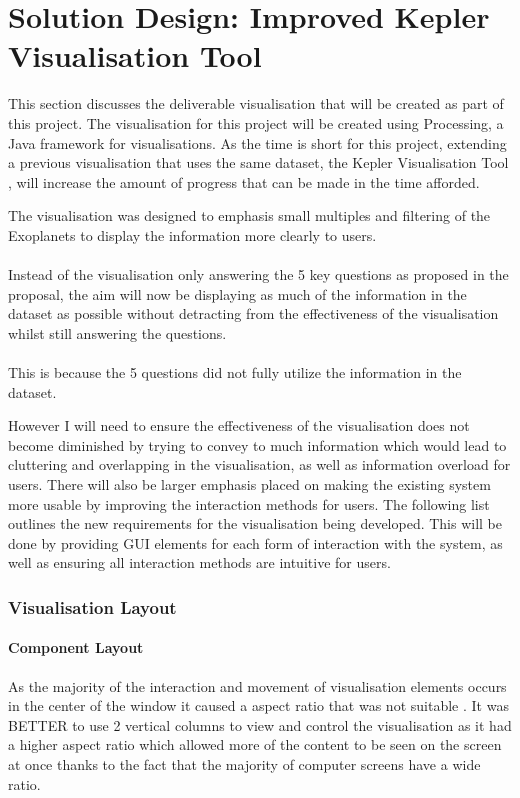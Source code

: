 \chapter{Solution Design: Improved Kepler Visualisation Tool}\label{C:sd}

This section discusses the deliverable visualisation that will be created as part of this project.
The visualisation for this project will be created using Processing, a Java framework for visualisations. As the time is short for this project, extending a previous visualisation that uses the same dataset, the Kepler Visualisation Tool \cite{kepler_github, kepler_article}, will increase the amount of progress that can be made in the time afforded.

The visualisation was designed to emphasis small multiples and filtering of the Exoplanets to display the information more clearly to users. 
\\\\
Instead of the visualisation only answering the 5 key questions as proposed in the proposal, the aim will now be displaying as much of the information in the dataset as possible without detracting from the effectiveness of the visualisation whilst still answering the questions. 
\\\\
This is because the 5 questions did not fully utilize the information in the dataset. 

However I will need to ensure the effectiveness of the visualisation does not become diminished by trying to convey to much information which would lead to cluttering and overlapping in the visualisation, as well as information overload for users. There will also be larger emphasis placed on making the existing system more usable by improving the interaction methods for users. The following list outlines the new requirements for the visualisation being developed. This will be done by 
providing GUI elements for each form of interaction with the system, as well as ensuring all interaction methods are intuitive for users. 
\subsection{Visualisation Layout}

\subsubsection{Component Layout}
As the majority of the interaction and movement of visualisation elements occurs in the center of the window it caused a aspect ratio that was not suitable . It was BETTER to use 2 vertical columns to view and control the visualisation as it had a higher aspect ratio which allowed more of the content to be seen on the screen at once thanks to the fact that the majority of computer screens have a wide ratio.

